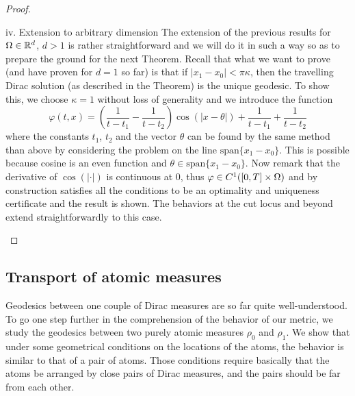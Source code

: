 \begin{proof}
\begin{paragraph}{iv. Extension to arbitrary dimension}
The extension of the previous results for $\Omega \in \mathbb{R}^d $, $d>1$ is rather straightforward and we will do it in such a way so as to prepare the ground for the next Theorem. Recall that what we want to prove (and have proven for $d=1$ so far) is that if $\vert x_1 -x_0 \vert < \pi \kappa$, then the travelling Dirac solution (as described in the Theorem) is the unique geodesic. To show this, we choose $\kappa=1$ without loss of generality and we introduce the function
\begin{equation} 
\varphi(t,x)=\left( \frac{1}{t-t_1}-\frac{1}{t-t_2} \right) \cos(\vert x-\theta \vert ) + \frac{1}{t-t_1}+\frac{1}{t-t_2} 
\label{certifddim}
\end{equation}
where the constants $t_1$, $t_2$ and the vector $\theta$ can be found by the same method than above by considering the problem on the line $\text{span}\{x_1 - x_0 \}$. This is possible because cosine is an even function and $\theta \in \text{span}\{x_1 - x_0 \}$. Now remark that the derivative of $\cos(\vert \cdot \vert)$ is continuous at $0$, thus $\varphi \in C^1([0,T]\times \Omega)$ and by construction satisfies all the conditions to be an optimality and uniqueness certificate and the result is shown. The behaviors at the cut locus and beyond extend straightforwardly to this case.
\end{paragraph}
\end{proof}

\subsection{Transport of atomic measures}

Geodesics between one couple of Dirac measures are so far quite well-understood. To go one step further in the comprehension of the behavior of our metric, we study the geodesics between two purely atomic measures $\rho_0$ and $\rho_1$. We show that under some geometrical conditions on the locations of the atoms, the behavior is similar to that of a pair of atoms. Those conditions require basically that the atoms be arranged by close pairs of Dirac measures, and the pairs should be far from each other. 


